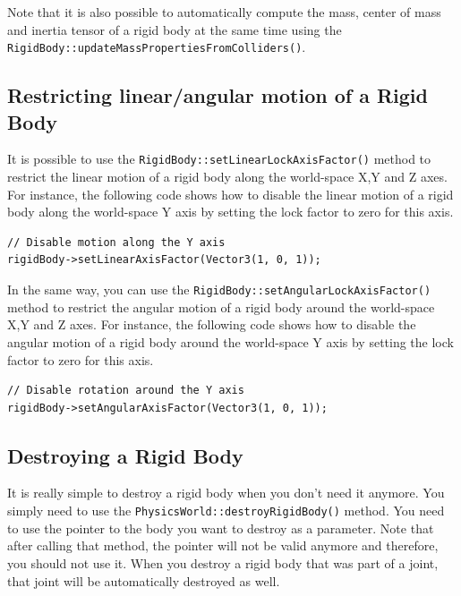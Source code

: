 \documentclass[a4paper,12pt]{article}
\begin{document}
    \vspace{0.6cm}

    \begin{sloppypar}
    Note that it is also possible to automatically compute the mass, center of mass and inertia tensor of a rigid body at the same time using the
    \texttt{RigidBody::updateMassPropertiesFromColliders()}.
    \end{sloppypar}

    \subsection{Restricting linear/angular motion of a Rigid Body}

    It is possible to use the \texttt{RigidBody::setLinearLockAxisFactor()} method to restrict the linear motion of a rigid body along the world-space
    X,Y and Z axes. For instance, the following code shows how to disable the linear motion of a rigid body along the world-space Y axis by setting the lock
    factor to zero for this axis. \\

    \begin{lstlisting}
// Disable motion along the Y axis
rigidBody->setLinearAxisFactor(Vector3(1, 0, 1));
  \end{lstlisting}

    \vspace{0.6cm}

    In the same way, you can use the \texttt{RigidBody::setAngularLockAxisFactor()} method to restrict the angular motion of a rigid body around the
    world-space X,Y and Z axes. For instance, the following code shows how to disable the angular motion of a rigid body around the world-space Y axis
    by setting the lock factor to zero for this axis. \\

    \begin{lstlisting}
// Disable rotation around the Y axis
rigidBody->setAngularAxisFactor(Vector3(1, 0, 1));
  \end{lstlisting}

    \subsection{Destroying a Rigid Body}

    \begin{sloppypar}
    It is really simple to destroy a rigid body when you don't need it anymore. You simply need to use the \texttt{PhysicsWorld::destroyRigidBody()}
    method. You need to use the pointer to the body you want to destroy as a parameter. Note that after calling that method, the pointer will not be valid
    anymore and therefore, you should not use it. When you destroy a rigid body that was part of a joint, that joint will be automatically destroyed as
    well. \\
    \end{sloppypar}
\end{document}
